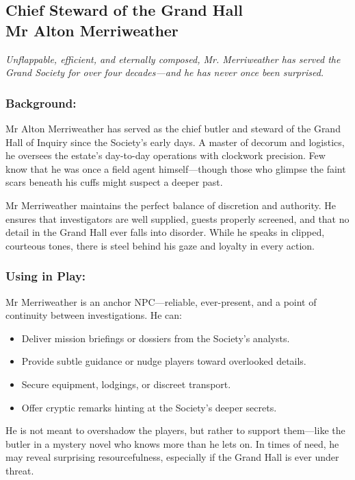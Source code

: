 \clearpage
    \subsection{{\small Chief Steward of the Grand Hall}\\ Mr Alton Merriweather}
    \label{npc:alton-merriweather}

        \emph{Unflappable, efficient, and eternally composed, Mr. Merriweather has served the Grand Society for over four decades—and he has never once been surprised.}
        \vspace{.5\baselineskip}
      
    \begin{paracol}{3}
        \subsubsection*{Background:}
        Mr Alton Merriweather has served as the chief butler and steward of the Grand Hall of Inquiry since the Society's early days. A master of decorum and logistics, he oversees the estate’s day-to-day operations with clockwork precision. Few know that he was once a field agent himself—though those who glimpse the faint scars beneath his cuffs might suspect a deeper past.
      
        Mr Merriweather maintains the perfect balance of discretion and authority. He ensures that investigators are well supplied, guests properly screened, and that no detail in the Grand Hall ever falls into disorder. While he speaks in clipped, courteous tones, there is steel behind his gaze and loyalty in every action.
      
        \switchcolumn
        \subsubsection*{Using in Play:}
        Mr Merriweather is an anchor NPC—reliable, ever-present, and a point of continuity between investigations. He can:
        \begin{itemize}
          \item Deliver mission briefings or dossiers from the Society’s analysts.
          \item Provide subtle guidance or nudge players toward overlooked details.
          \item Secure equipment, lodgings, or discreet transport.
          \item Offer cryptic remarks hinting at the Society’s deeper secrets.
        \end{itemize}
        He is not meant to overshadow the players, but rather to support them—like the butler in a mystery novel who knows more than he lets on. In times of need, he may reveal surprising resourcefulness, especially if the Grand Hall is ever under threat.
      

\end{paracol}
